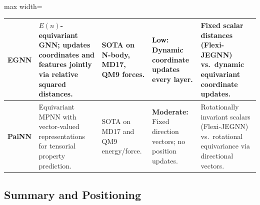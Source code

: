 \documentclass[pdflatex,sn-vancouver-num]{sn-jnl}%
\theoremstyle{thmstyleone}%
\theoremstyle{thmstyletwo}%
\theoremstyle{thmstylethree}%
\renewenvironment{table}[1][htbp]%
{\begin{tableorg}[#1]%
\begin{center}
\begin{adjustbox}{max width=\linewidth}
\begin{threeparttable}
\tablebodyfont%
\renewcommand\footnotetext[2][]{{\removelastskip\vskip3pt%
\let\tablebodyfont\tablefootnotefont%
\hskip0pt\if!##1!\else{\smash{$^{##1}$}}\fi##2\par}}%
}{\end{threeparttable}\end{adjustbox}\end{center}\end{tableorg}}
\begin{document}
\begin{table}[htbp]
\begin{tabular}{|p{}|p{}|p{}|p{}|p{}|}
    \hline

    \textbf{EGNN} \cite{satorras2021egnn} & $E(n)$-equivariant GNN; updates coordinates and features jointly via relative squared distances. & SOTA on N-body, MD17, QM9 forces. & \textbf{Low:} Dynamic coordinate updates every layer. & Fixed scalar distances (Flexi-JEGNN) vs.\ dynamic equivariant coordinate updates. \\
    \hline

    \textbf{PaiNN} \cite{schutt2021painn} & Equivariant MPNN with vector-valued representations for tensorial property prediction. & SOTA on MD17 and QM9 energy/force. & \textbf{Moderate:} Fixed direction vectors; no position updates. & Rotationally invariant scalars (Flexi-JEGNN) vs.\ rotational equivariance via directional vectors. \\
    \hline
    
  \end{tabular}
\end{table}



\subsection{Summary and Positioning}
\label{ssec:summary_positioning}
\end{document}
